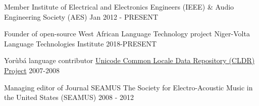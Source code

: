

\begin{cventries}

  \cventry
    {Member} %
    {Institute of Electrical and Electronics Engineers (IEEE) \& Audio Engineering Society (AES)} %
    {} %
    {Jan 2012 - PRESENT} %
    {
      \begin{cvitems} %
      \end{cvitems}
    }

  \cventry
    {Founder of open-source West African Language Technology project} %
    {Niger-Volta Language Technologies Institute} %
    {} %
    {2018-PRESENT} %
    {
      \begin{cvitems} %
      \end{cvitems}
    }

  \cventry
    {Yor{\`u}b{\'a} language contributor} %
    {\href{http://cldr.unicode.org/}{Unicode Common Locale Data Repository (CLDR) Project}} %
    {} %
    {2007-2008} %
    {
      \begin{cvitems} %
      \end{cvitems}
    }

  \cventry
    {Managing editor of Journal SEAMUS} %
    {The Society for Electro-Acoustic Music in the United States (SEAMUS)} %
    {} %
    {2008 - 2012} %
    {
      \begin{cvitems} %
      \end{cvitems}
    }


\end{cventries}
